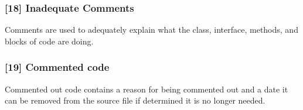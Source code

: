 \subsubsection{[18] Inadequate Comments}
Comments are used to adequately explain what the class, interface, methods, and blocks of code are doing.
\subsubsection{[19] Commented code}
Commented out code contains a reason for being commented out and a date it can be removed from the source file if determined it is no longer needed.